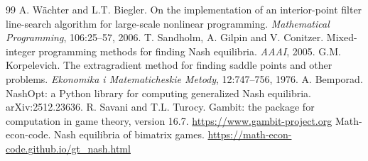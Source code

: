 \documentclass[10pt,a4paper]{article}
\begin{document}
\begin{thebibliography}{99}
 A. W\"achter and L.T. Biegler. On the implementation of an interior-point filter line-search algorithm for large-scale nonlinear programming. \emph{Mathematical Programming}, 106:25--57, 2006.
 T. Sandholm, A. Gilpin and V. Conitzer. Mixed-integer programming methods for finding Nash equilibria. \emph{AAAI}, 2005.
 G.M. Korpelevich. The extragradient method for finding saddle points and other problems. \emph{Ekonomika i Matematicheskie Metody}, 12:747--756, 1976.
 A. Bemporad. NashOpt: a Python library for computing generalized Nash equilibria. arXiv:2512.23636.
 R. Savani and T.L. Turocy. Gambit: the package for computation in game theory, version 16.7. \url{https://www.gambit-project.org}
 Math-econ-code. Nash equilibria of bimatrix games. \url{https://math-econ-code.github.io/gt_nash.html}
\end{thebibliography}
\end{document}
